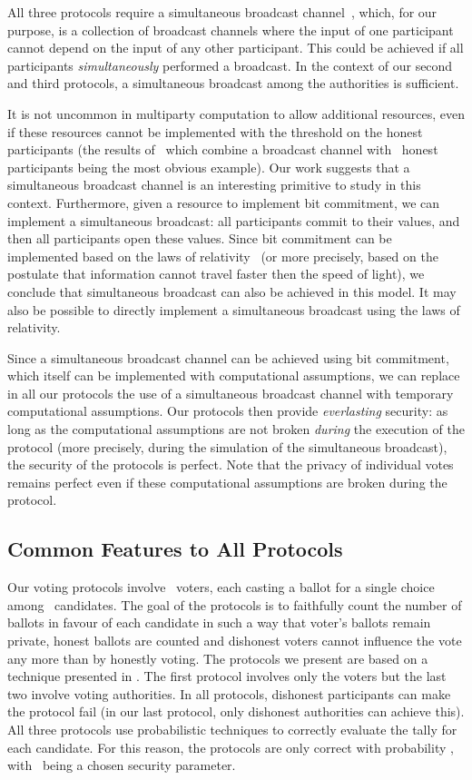 \documentclass[runningheads]{llncs}
\begin{document}
All three protocols  require a  simultaneous broadcast
channel~\cite{CGMW85,HD05}, which, for our purpose, is  a collection
of broadcast channels where the input of one participant cannot
depend on the input of any other participant. This could be achieved
if all participants {\em simultaneously} performed a broadcast. In
the context of our second and third protocols, a simultaneous
broadcast among the authorities is sufficient.

It is not uncommon in multiparty computation to allow additional
resources, even if these resources cannot be implemented with the
threshold on the honest participants (the results of~\cite{RB89}
which combine a broadcast channel with~ honest participants
being the most obvious example). Our work suggests that a
simultaneous broadcast channel is an interesting primitive to study
in this context. Furthermore, given a resource to implement bit
commitment, we can implement a simultaneous broadcast: all
participants commit to their values, and then all participants open
these values. Since bit commitment can be implemented based on the
laws of relativity~\cite{Kent99} (or more precisely, based on the
postulate that information cannot travel faster then the speed of light),
we conclude that simultaneous broadcast can also be achieved in this
model. It may also be possible to directly implement a simultaneous
broadcast using the laws of relativity.

Since a simultaneous broadcast channel can be achieved using bit
commitment, which itself can be implemented with computational
assumptions, we can replace in all our protocols the use of a
simultaneous broadcast channel with temporary computational
assumptions. Our protocols then provide \emph{everlasting} security:
as long as the computational assumptions are not broken
\emph{during} the execution of the protocol (more precisely, during
the simulation of the simultaneous broadcast), the security of the
protocols is perfect. Note that the privacy of individual votes
remains perfect even if these computational assumptions are broken
during the protocol.



\subsection{Common Features to All Protocols}

Our voting protocols involve ~voters, each casting a ballot for a
single choice among ~candidates. The goal of the protocols is to
faithfully count the number of ballots in favour of each candidate
in such a way that voter's ballots remain private, honest ballots
are counted and dishonest voters cannot influence the vote any more
than by honestly voting. The protocols we present are based on a
technique presented in \cite{BroadbentTapp}. The first protocol
involves only the voters but the last two involve  voting
authorities. In all protocols, dishonest participants can make the
protocol fail (in our last protocol, only dishonest authorities can
achieve this). All three protocols use probabilistic techniques to
correctly evaluate the tally for each candidate. For this reason,
the protocols are only correct with probability ,
with~ being a chosen security parameter.
\end{document}
